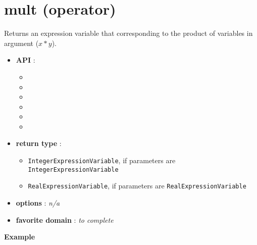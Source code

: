 \label{mult}
\hypertarget{mult}{}

\section{mult (operator)}\label{mult:multoperator}\hypertarget{mult:multoperator}{}
Returns an expression variable that corresponding to the product of variables in argument (\(x*y\)).

\begin{itemize}
	\item \textbf{API} :
	\begin{itemize}
		\item {}
		\item {}
		\item {}
		\item {}
		\item {}
		\item {}
	\end{itemize}
	\item \textbf{return type} :
	\begin{itemize}
		\item \texttt{IntegerExpressionVariable}, if parameters are \texttt{IntegerExpressionVariable}
		\item \texttt{RealExpressionVariable}, if parameters are \texttt{RealExpressionVariable}
	\end{itemize}
	\item \textbf{options} : \emph{n/a}
	\item \textbf{favorite domain} : \emph{to complete}
\end{itemize}

\textbf{Example}

